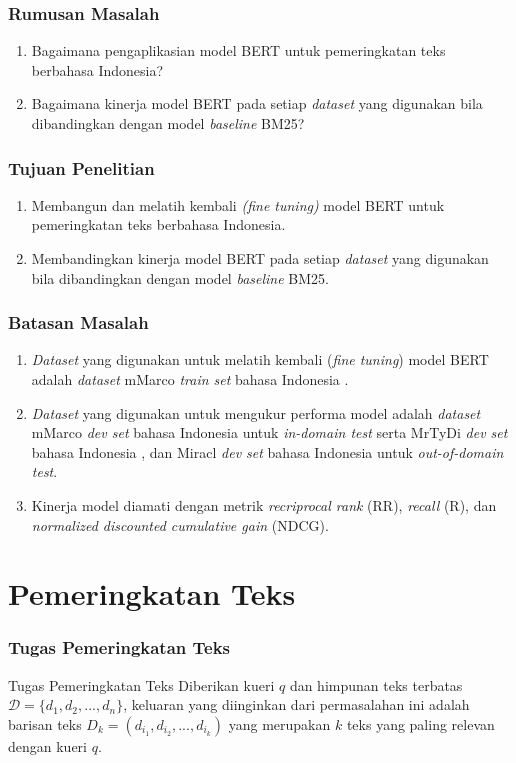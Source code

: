 \documentclass[10pt]{beamer}
\newcommand{\f}[1]{\textit{#1}}
\begin{document}
\begin{frame}
\frametitle{Rumusan Masalah}

\begin{enumerate}
	\item Bagaimana pengaplikasian model BERT untuk pemeringkatan teks berbahasa Indonesia?
	\item Bagaimana kinerja model BERT pada setiap \f{dataset} yang digunakan bila dibandingkan dengan model \f{baseline} BM25?
\end{enumerate}

\end{frame}

\begin{frame}
    \frametitle{Tujuan Penelitian}
    \begin{enumerate}
        \item Membangun dan melatih kembali \f{(fine tuning)} model BERT untuk pemeringkatan teks berbahasa Indonesia.
        \item Membandingkan kinerja model BERT pada setiap \f{dataset} yang digunakan bila dibandingkan dengan model \f{baseline} BM25.
    \end{enumerate}
\end{frame}

\begin{frame}
    \frametitle{Batasan Masalah}
    \begin{enumerate}
    \item \f{Dataset} yang digunakan untuk melatih kembali (\f{fine tuning}) model BERT adalah \f{dataset} mMarco \f{train set} bahasa Indonesia \citep{mmarco}.
	\item \f{Dataset} yang digunakan untuk mengukur performa model adalah \f{dataset} mMarco \f{dev set} bahasa Indonesia \citep{mmarco} untuk \f{in-domain test} serta MrTyDi \f{dev set} bahasa Indonesia \citep{mrtydi}, dan Miracl \f{dev set} bahasa Indonesia \citep{miracl} untuk \f{out-of-domain test}.
	\item Kinerja model diamati dengan metrik \f{recriprocal rank} (RR), \f{recall} (R), dan \f{normalized discounted cumulative gain} (NDCG).
    \end{enumerate}
\end{frame}
    
\section{Pemeringkatan Teks}

\begin{frame}
\frametitle{Tugas Pemeringkatan Teks}

    \begin{block}{Tugas Pemeringkatan Teks}
        Diberikan kueri $q$ dan himpunan teks terbatas $\mathcal{D}= \{d_1, d_2, ..., d_n\}$, keluaran yang diinginkan dari permasalahan ini adalah barisan teks $D_k = (d_{i_1}, d_{i_2}, ..., d_{i_k})$ yang merupakan $k$ teks yang paling relevan dengan kueri $q$.
    \end{block}
\end{frame}
\end{document}
